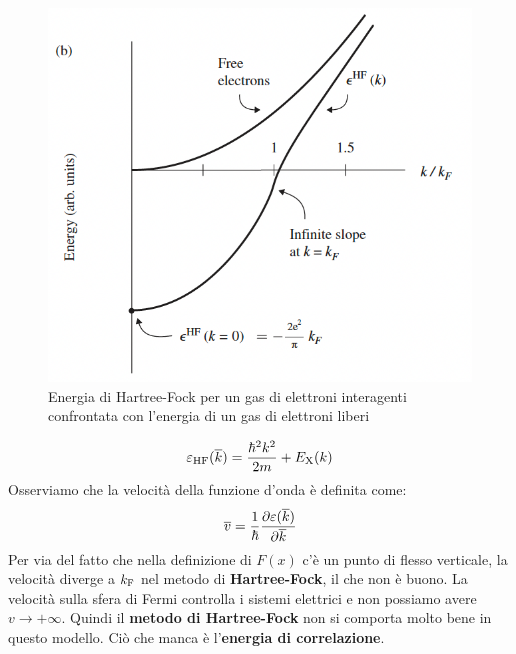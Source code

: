 \begin{figure}[!ht]
    \centering
    \includegraphics[scale=0.6]{images/energyjellium.png}
    \caption{Energia di Hartree-Fock per un gas di elettroni interagenti confrontata con l'energia di un gas di elettroni liberi}
    \label{fig:energyjellium}
\end{figure}
\begin{equation*}
    \varepsilon_{\text{HF}}(\overline k)=\frac{\hbar^2k^2}{2m}+E_{\text X}(k)
\end{equation*}
Osserviamo che la velocità della funzione d'onda è definita come:
\begin{equation*}
    \overline v = \frac{1}{\hbar}\partialderivative{\varepsilon(\overline k)}{\overline k}
\end{equation*}
Per via del fatto che nella definizione di $F(x)$ c'è un punto di flesso verticale, la velocità diverge a $k_{\text F}$ nel metodo di \textbf{Hartree-Fock}, il che non è buono. La velocità sulla sfera di Fermi controlla i sistemi elettrici e non possiamo avere $v \rightarrow +\infty$. Quindi il \textbf{metodo di Hartree-Fock} non si comporta molto bene in questo modello. Ciò che manca è l'\textbf{energia di correlazione}.
